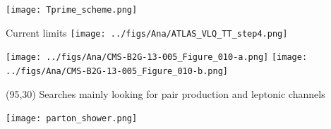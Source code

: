 \begin{frame}{}
\vspace{-.2cm}
\begin{center}
    \texttt{[image: Tprime\_scheme.png]}
  \end{center}
\end{frame}



\begin{frame}{Current limits}
\vspace{-.2cm}
\texttt{[image: ../figs/Ana/ATLAS\_VLQ\_TT\_step4.png]}\\
\begin{center}
\texttt{[image: ../figs/Ana/CMS-B2G-13-005\_Figure\_010-a.png]}
\texttt{[image: ../figs/Ana/CMS-B2G-13-005\_Figure\_010-b.png]}
  \end{center}
\begin{textblock}{25}(95,30)\scriptsize
Searches mainly looking for pair production and leptonic channels 
\end{textblock}

\end{frame}







\iffalse
\begin{frame}{}
\vspace{-.2cm}
\begin{center}
    \texttt{[image: parton\_shower.png]}
  \end{center}
\end{frame}


